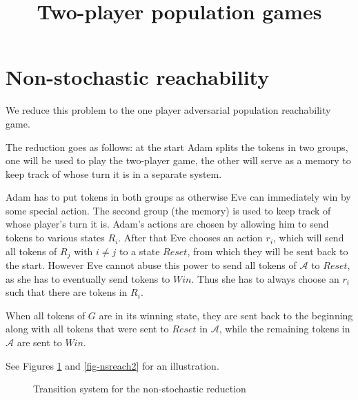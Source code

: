 \documentclass{article}
\title{Two-player population games}
\author{}
\date{}
\begin{document}
	
	\maketitle
	
	\section{Non-stochastic reachability}
	
	We reduce this problem to the one player adversarial population reachability game.
	
	The reduction goes as follows: at the start Adam splits the tokens in two groups, one will be used to play the two-player game, the other will serve as a memory to keep track of whose turn it is in a separate system.
	
	Adam has to put tokens in both groups as otherwise Eve can immediately win by some special action. The second group (the memory) is used to keep track of whose player's turn it is. Adam's actions are chosen by allowing him to send tokens to various states $R_i$. After that Eve chooses an action $r_i$, which will send all tokens of $R_j$ with $i\neq j$ to a state $Reset$, from which they will be sent back to the start. However Eve cannot abuse this power to send all tokens of $\mathcal{A}$ to $Reset$, as she has to eventually send tokens to $Win$. Thus she has to always choose an $r_i$ such that there are tokens in $R_i$.
	
	When all tokens of $G$ are in its winning state, they are sent back to the beginning along with all tokens that were sent to $Reset$ in $\mathcal{A}$, while the remaining tokens in $\mathcal{A}$ are sent to $Win$. 
	
	See Figures \ref{fig-nsreach1} and \ref{fig-nsreach2} for an illustration.
	
	\begin{figure}[h]
		\caption{Transition system for the non-stochastic reduction}
		\label{fig-nsreach1}
	\end{figure}
	
\end{document}
